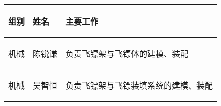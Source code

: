 
\begin{longtable}{ p{2cm} | p{3.5cm} | p{9.3cm} |}

    \hline

    \endfoot
    
    \rowcolor{tabhdcolor}

        \begin{center}
            组别
        \end{center} &
        \begin{center}
            姓名
        \end{center} &
        \begin{center}
            主要工作
        \end{center} \\

    \hline

    \endhead

        \begin{center}
            机械
        \end{center} &
        \begin{center}
            陈锐谦
        \end{center} &
        \begin{center}
            负责飞镖架与飞镖体的建模、装配
        \end{center}  \\
        
    \hline
        \begin{center}
            机械
        \end{center}&
        \begin{center}
            吴智恒
        \end{center}&
        \begin{center}
            负责飞镖架与飞镖装填系统的建模、装配
        \end{center}\\


\end{longtable}
